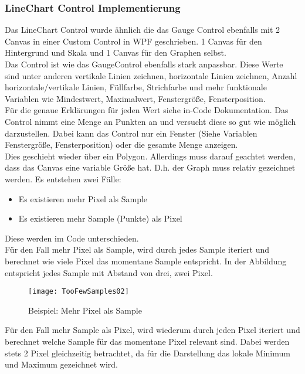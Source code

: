 \subsubsection{LineChart Control Implementierung}
Das LineChart Control wurde ähnlich die das Gauge Control ebenfalls mit 2 Canvas in einer Custom Control in WPF geschrieben. 1 Canvas für den Hintergrund und Skala und 1 Canvas für den Graphen selbst.\\
Das Control ist wie das GaugeControl ebenfalls stark anpassbar. Diese Werte sind unter anderen vertikale Linien zeichnen, horizontale Linien zeichnen, Anzahl horizontale/vertikale Linien, Füllfarbe, Strichfarbe und mehr funktionale Variablen wie Mindestwert, Maximalwert, Fenstergröße, Fensterposition.\\
Für die genaue Erklärungen für jeden Wert siehe in-Code Dokumentation.
Das Control nimmt eine Menge an Punkten an und versucht diese so gut wie möglich darzustellen. Dabei kann das Control nur ein Fenster (Siehe Variablen Fenstergröße, Fensterposition) oder die gesamte Menge anzeigen.\\
Dies geschieht wieder über ein Polygon. Allerdings muss darauf geachtet werden, dass das Canvas eine variable Größe hat. D.h. der Graph muss relativ gezeichnet werden. Es entstehen zwei Fälle:\\
\begin{itemize}
	\item Es existieren mehr Pixel als Sample
	\item Es existieren mehr Sample (Punkte) als Pixel
\end{itemize}
Diese werden im Code unterschieden.\\
\newpage
Für den Fall mehr Pixel als Sample, wird durch jedes Sample iteriert und berechnet wie viele Pixel das momentane Sample entspricht. In der Abbildung entspricht jedes Sample mit Abstand von drei, zwei Pixel.\\
\begin{figure}[ht]
	\centering
	\texttt{[image: TooFewSamples02]}
	\caption{Beispiel: Mehr Pixel als Sample}
	\label{fig:gauge3}
\end{figure}

Für den Fall mehr Sample als Pixel, wird wiederum durch jeden Pixel iteriert und berechnet welche Sample für das momentane Pixel relevant sind. Dabei werden stets 2 Pixel gleichzeitig betrachtet, da für die Darstellung das lokale Minimum und Maximum gezeichnet wird.\\

